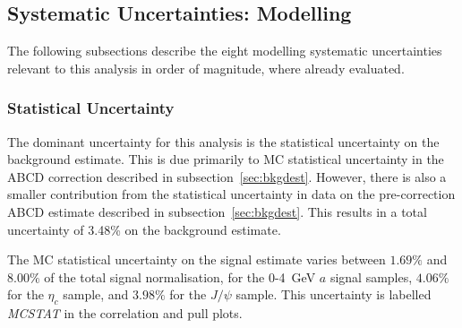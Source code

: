 \documentclass[NOTE, atlasdraft=true, texlive=2017, UKenglish]{\ATLASLATEXPATH atlasdoc}
\begin{document}
\subsection{Systematic Uncertainties: Modelling}
\label{sec:systematicstheory}

The following subsections describe the eight modelling systematic uncertainties relevant to this analysis in order of magnitude, where already evaluated.





\subsubsection{Statistical Uncertainty}
\label{sec:sysbkgdmcstat}

The dominant uncertainty for this analysis is the statistical uncertainty on the background estimate. This is due primarily to MC statistical uncertainty in the ABCD correction described in subsection~\ref{sec:bkgdest}. However, there is also a smaller contribution from the statistical uncertainty in data on the pre-correction ABCD estimate described in subsection~\ref{sec:bkgdest}. This results in a total uncertainty of 3.48\% on the background estimate.

The MC statistical uncertainty on the signal estimate varies between $1.69\%$ and $8.00\%$ of the total signal normalisation, for the 0-4~GeV $a$ signal samples, $4.06\%$ for the $\eta_c$ sample, and $3.98\%$ for the $J/\psi$ sample. This uncertainty is labelled \emph{MCSTAT} in the correlation and pull plots.
\end{document}
